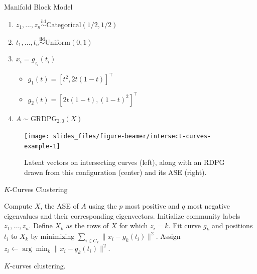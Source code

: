 \documentclass[
  ignorenonframetext,
]{beamer}
\providecommand{\tightlist}{%
  \setlength{\itemsep}{0pt}\setlength{\parskip}{0pt}}
\begin{document}
\begin{frame}{Manifold Block Model}
\protect\hypertarget{manifold-block-model-1}{}
\begin{enumerate}
\tightlist
\item
  \(z_1, ..., z_n \stackrel{\text{iid}}{\sim}\text{Categorical}(1/2, 1/2)\)
\item
  \(t_1, ..., t_n \stackrel{\text{iid}}{\sim}\text{Uniform}(0, 1)\)
\item
  \(x_i = g_{z_i}(t_i)\)

  \begin{itemize}
  \tightlist
  \item
    \(g_1(t) = [t^2, 2 t (1-t)]^\top\)
  \item
    \(g_2(t) = [2 t (1-t), (1-t)^2]^\top\)
  \end{itemize}
\item
  \(A \sim \text{GRDPG}_{2, 0}(X)\)
\end{enumerate}

\begin{figure}

{\centering \texttt{[image: slides\_files/figure-beamer/intersect-curves-example-1]} 

}

\caption{Latent vectors on intersecting curves (left), along with an RDPG drawn from this configuration (center) and its ASE (right).}\label{intersect-curves-example}
\end{figure}
\end{frame}

\begin{frame}{\(K\)-Curves Clustering}
\protect\hypertarget{k-curves-clustering}{}
\begin{algorithm}[H]
\label{alg:kcurves}
\scriptsize
\DontPrintSemicolon
\SetAlgoLined
{}
Compute $X$, the ASE of $A$ using the $p$ most positive and $q$ most negative eigenvalues and their corresponding eigenvectors.\;
Initialize community labels $z_1, ..., z_n$.\;
 {
 {
Define $X_k$ as the rows of $X$ for which $z_i = k$.\;
Fit curve $g_k$ and positions $t_{i}$ to $X_k$ by minimizing $\sum_{i \in C_k} \|x_{i} - g_k(t_{i})\|^2$.\;
}
 {
Assign $z_i \leftarrow \arg\min_k \|x_i - g_k(t_i)\|^2$.\;
}
}
\caption{$K$-curves clustering.}
\end{algorithm}
\end{frame}
\end{document}
